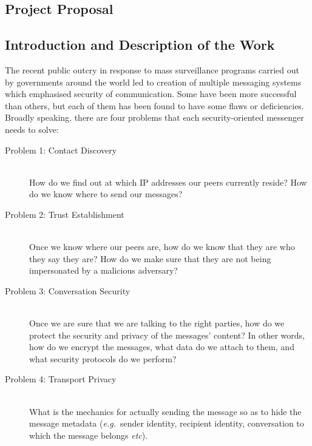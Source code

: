 \documentclass[a4paper, twoside, 12pt]{report}
\newcommand{\skippage}{\cleardoublepage}
\begin{document}
\begin{appendices}

\skippage

\chapter{Project Proposal}
\label{appendix:proposal}
\section{Introduction and Description of the Work}
\label{intro}
The recent public outcry in response to mass surveillance programs carried out by governments around the world led to creation of multiple messaging systems which emphasised security of communication. Some have been more successful than others, but each of them has been found to have some flaws or deficiencies. Broadly speaking, there are four problems that each security-oriented messenger needs to solve:
\begin{description}
    \item[Problem 1: Contact Discovery] \hfill \\
        How do we find out at which IP addresses our peers currently reside? How do we know where to send our messages?
    \item[Problem 2: Trust Establishment]\hfill \\
        Once we know where our peers are, how do we know that they are who they say they are? How do we make sure that they are not being impersonated by a malicious adversary?
    \item[Problem 3: Conversation Security]\hfill \\
        Once we are sure that we are talking to the right parties, how do we protect the security and privacy of the messages' content? In other words, how do we encrypt the messages, what data do we attach to them, and what security protocols do we perform?
    \item[Problem 4: Transport Privacy]\hfill \\
        What is the mechanics for actually sending the message so as to hide the message metadata (\textit{e.g.}~sender identity, recipient identity, conversation to which the message belongs \textit{etc}).
\end{description}


\end{appendices}
\end{document}
